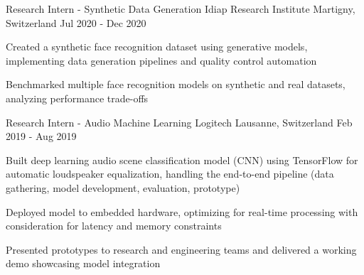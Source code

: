 \begin{cventries}
  \cventry
    {Research Intern - Synthetic Data Generation} %
    {Idiap Research Institute} %
    {Martigny, Switzerland} %
    {Jul 2020 - Dec 2020} %
    {
      \begin{cvitems} %
        \item {Created a synthetic face recognition dataset using generative models, implementing data generation pipelines and quality control automation}
        \item {Benchmarked multiple face recognition models on synthetic and real datasets, analyzing performance trade-offs}
      \end{cvitems}
    }

  \cventry
    {Research Intern - Audio Machine Learning} %
    {Logitech} %
    {Lausanne, Switzerland} %
    {Feb 2019 - Aug 2019} %
    {
      \begin{cvitems} %
        \item {Built deep learning audio scene classification model (CNN) using TensorFlow for automatic loudspeaker equalization, handling the end-to-end pipeline (data gathering, model development, evaluation, prototype)}
        \item {Deployed model to embedded hardware, optimizing for real-time processing with consideration for latency and memory constraints}
        \item {Presented prototypes to research and engineering teams and delivered a working demo showcasing model integration}
      \end{cvitems}
    }

\end{cventries}
